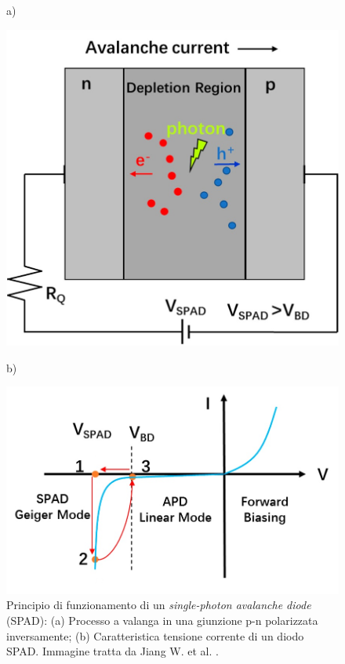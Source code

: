 \begin{figure}[b!]
	\centering
	a)
	\begin{minipage}{.45\textwidth}
		\includegraphics[width=0.8\linewidth]{./ImageFiles/spad_scheme.png}
	\end{minipage}
	b)
	\begin{minipage}{.45\textwidth}
		\includegraphics[width=\linewidth]{./ImageFiles/spad_VI.png}
	\end{minipage}
	\caption{Principio di funzionamento di un \textit{single-photon avalanche diode} (SPAD): (a) Processo a valanga in una giunzione p-n polarizzata inversamente; (b) Caratteristica tensione corrente di un diodo SPAD. Immagine tratta da Jiang W. et al. \cite{Jiang2019}.} 
	\label{fig:spad_VI}
\end{figure}
\newpage
